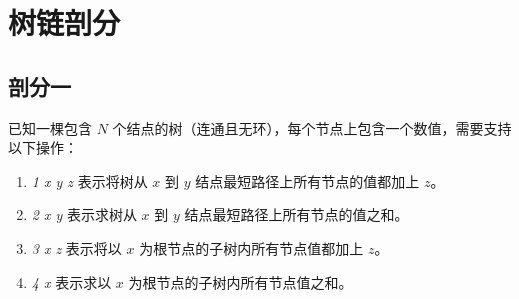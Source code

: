 \section{树链剖分}
\subsection{剖分一}
已知一棵包含 $N$ 个结点的树（连通且无环），每个节点上包含一个数值，需要支持以下操作：
\begin{enumerate}[操作1.]
    \item \textit{1 x y z} 表示将树从 $x$ 到 $y$ 结点最短路径上所有节点的值都加上 $z$。
    \item \textit{2 x y} 表示求树从 $x$ 到 $y$ 结点最短路径上所有节点的值之和。
    \item \textit{3 x z} 表示将以 $x$ 为根节点的子树内所有节点值都加上 $z$。
    \item \textit{4 x} 表示求以 $x$ 为根节点的子树内所有节点值之和。
\end{enumerate}

